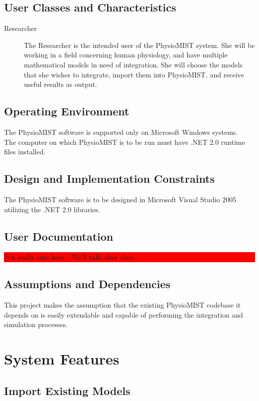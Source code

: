 \documentclass{article}
\newcommand{\todo}[1]{\colorbox{red}{\begin{minipage}{\textwidth}{#1}\end{minipage}}}
\begin{document}
\subsection{User Classes and Characteristics}
\begin{description}
\item[Researcher]
The Researcher is the intended user of the PhysioMIST system. She will be working in a field concerning human physiology, and have multiple mathematical models in need of integration. She will choose the models that she wishes to integrate, import them into PhysioMIST, and receive useful results as output.
\end{description}

\subsection{Operating Environment}
The PhysioMIST software is supported only on Microsoft Windows systems. \\
The computer on which PhysioMIST is to be run must have .NET 2.0 runtime files installed. \\

\subsection{Design and Implementation Constraints}
The PhysioMIST software is to be designed in Microsoft Visual Studio 2005 utilizing the .NET 2.0 libraries.

\subsection{User Documentation}
\todo{Not really sure here - We'll talk after class.}

\subsection{Assumptions and Dependencies}
This project makes the assumption that the existing PhysioMIST codebase it depends on is easily extendable and capable of performing the integration and simulation processes.


\section{System Features}

\subsection{Import Existing Models}
\end{document}

